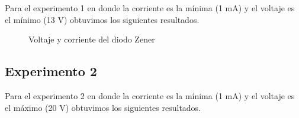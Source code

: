 \documentclass{mylib/reporteConCalif}
\begin{document}
Para el experimento 1 en donde la corriente es la mínima (1 mA) y el voltaje es el mínimo (13 V) obtuvimos los siguientes resultados.

\begin{figure}[H]%
    \centering
    \qquad
    \caption{Voltaje y corriente del diodo Zener}%
    \label{fig:example}%
\end{figure}

\subsection{Experimento 2}

Para el experimento 2 en donde la corriente es la mínima (1 mA) y el voltaje es el máximo (20 V) obtuvimos los siguientes resultados.
\end{document}
